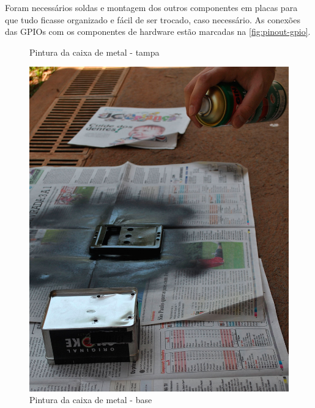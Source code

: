 Foram necessários soldas e montagem dos outros componentes em placas para que tudo ficasse organizado e fácil de ser trocado, caso necessário. As conexões das GPIOs com os componentes de hardware estão marcadas na \autoref{fig:pinout-gpio}.

\begin{figure}[htb]
	\centering
 	\begin{minipage}{0.45\textwidth}
		\centering
		\caption{\label{fig:pintar-1}Pintura da caixa de metal - tampa}
		\includegraphics[width=1\textwidth]{img/pintar-1.jpg}
	\end{minipage}
	\hfill
	\begin{minipage}{0.45\textwidth}
		\centering
		\caption{\label{fig:pintar-2}Pintura da caixa de metal - base}

\end{minipage}
\end{figure}

